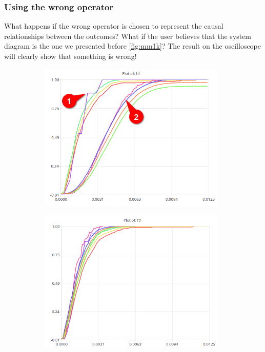        \subsubsection{Using the wrong operator}
            What happens if the wrong operator is chosen to represent the causal relationships between the outcomes? What if the user believes that the system diagram is the one we presented before \cref{fig:mm1k}? The result on the oscilloscope will clearly show that something is wrong! 
            \begin{figure}[H]
                \centering
                \begin{subfigure}{.5\textwidth}
                    \centering
                    \includegraphics[width =0.98\textwidth]{img/bad1.png}
                    \label{fig:bad}
                \end{subfigure}%
                \begin{subfigure}{.5\textwidth}%
                    \centering%
                    \includegraphics[width =0.98\textwidth]{img/good.png}%

\end{subfigure}
\end{figure}
